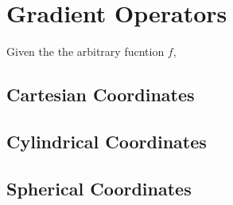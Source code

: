 \chapter{Gradient Operators}
\begin{comment}
\end{comment}
Given the the arbitrary fucntion $f$,
\section{Cartesian Coordinates}
\begin{comment}
\end{comment}
\section{Cylindrical Coordinates}
\begin{comment}
\end{comment}
\section{Spherical Coordinates}
\begin{comment}
\end{comment}
